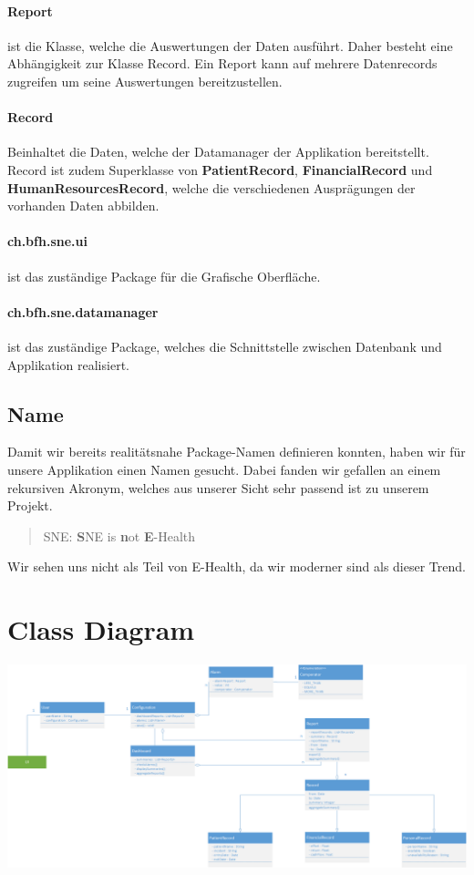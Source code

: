 \documentclass[a4paper]{scrreprt}
\begin{document}
\paragraph{Report} ist die Klasse, welche die Auswertungen der Daten ausführt. Daher besteht eine Abhängigkeit zur Klasse Record. Ein Report kann auf mehrere Datenrecords zugreifen um seine Auswertungen bereitzustellen.

\paragraph{Record} Beinhaltet die Daten, welche der Datamanager der Applikation bereitstellt. Record ist zudem Superklasse von \textbf{PatientRecord}, \textbf{FinancialRecord} und \textbf{HumanResourcesRecord}, welche die verschiedenen Ausprägungen der vorhanden Daten abbilden.

\paragraph{ch.bfh.sne.ui} ist das zuständige Package für die Grafische Oberfläche.

\paragraph{ch.bfh.sne.datamanager} ist das zuständige Package, welches die Schnittstelle zwischen Datenbank und Applikation realisiert.


\subsection{Name}
Damit wir bereits realitätsnahe Package-Namen definieren konnten, haben wir für unsere Applikation einen Namen gesucht. Dabei fanden wir gefallen an einem rekursiven Akronym, welches aus unserer Sicht sehr passend ist zu unserem Projekt.

\begin{quote}
SNE: \textbf{S}NE is \textbf{n}ot \textbf{E}-Health
\end{quote}

Wir sehen uns nicht als Teil von E-Health, da wir moderner sind als dieser Trend.


\section{Class Diagram}

\includegraphics[width=1\textwidth]{./ClassDiagram.png}
\end{document}
